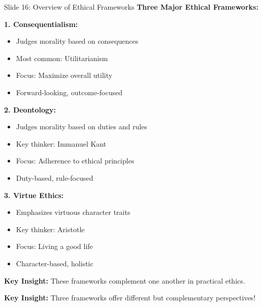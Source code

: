 \documentclass[8pt]{beamer}
\begin{document}
	
	\begin{frame}{Slide 16: Overview of Ethical Frameworks}
		\fontsize{6.5}{7.5}\selectfont
		\textbf{Three Major Ethical Frameworks:}
		
		\vspace{0.1cm}
		\textbf{1. Consequentialism:}
		\begin{itemize}
			\item Judges morality based on consequences
			\item Most common: Utilitarianism
			\item Focus: Maximize overall utility
			\item Forward-looking, outcome-focused
		\end{itemize}
		
		\vspace{0.1cm}
		\textbf{2. Deontology:}
		\begin{itemize}
			\item Judges morality based on duties and rules
			\item Key thinker: Immanuel Kant
			\item Focus: Adherence to ethical principles
			\item Duty-based, rule-focused
		\end{itemize}
		
		\vspace{0.1cm}
		\textbf{3. Virtue Ethics:}
		\begin{itemize}
			\item Emphasizes virtuous character traits
			\item Key thinker: Aristotle
			\item Focus: Living a good life
			\item Character-based, holistic
		\end{itemize}
		
		\vspace{0.1cm}
		\textbf{Key Insight:}
		These frameworks complement one another in practical ethics.
		
		\textcolor{myblue}{\textbf{Key Insight:}} Three frameworks offer \textcolor{myblue}{different but complementary perspectives}!
	\end{frame}
	
\end{document}
